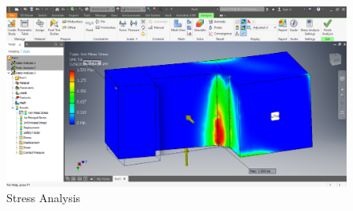\documentclass{article}
\begin{document}
\begin{figure}
    \centering
    \includegraphics[width=.6\textwidth]{14_12-03/images/Stress_Analysis.png}
    \caption{Stress Analysis}
    \label{fig:stress}
\end{figure}
\end{document}
